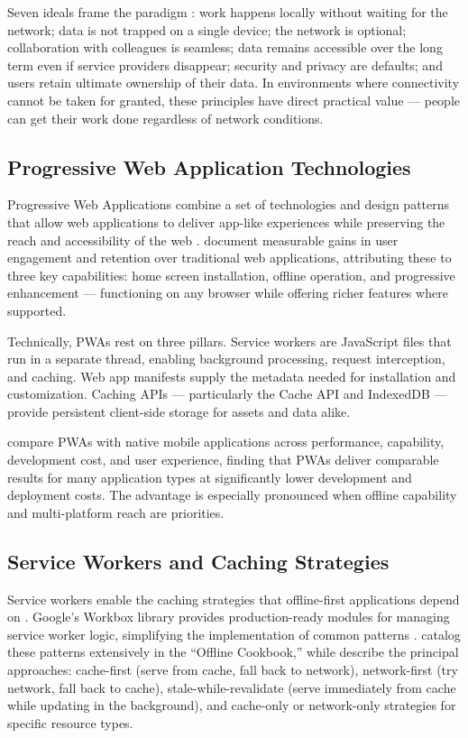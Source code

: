 Seven ideals frame the paradigm \citep{Kleppmann2019}: work happens locally without waiting for the network; data is not trapped on a single device; the network is optional; collaboration with colleagues is seamless; data remains accessible over the long term even if service providers disappear; security and privacy are defaults; and users retain ultimate ownership of their data. In environments where connectivity cannot be taken for granted, these principles have direct practical value --- people can get their work done regardless of network conditions.

\subsection{Progressive Web Application Technologies}

Progressive Web Applications combine a set of technologies and design patterns that allow web applications to deliver app-like experiences while preserving the reach and accessibility of the web \citep{AterPWA2017, Majchrzak2018}. \citet{Tandel2018} document measurable gains in user engagement and retention over traditional web applications, attributing these to three key capabilities: home screen installation, offline operation, and progressive enhancement --- functioning on any browser while offering richer features where supported.

Technically, PWAs rest on three pillars. Service workers are JavaScript files that run in a separate thread, enabling background processing, request interception, and caching. Web app manifests supply the metadata needed for installation and customization. Caching APIs --- particularly the Cache API and IndexedDB --- provide persistent client-side storage for assets and data alike.

\citet{BiornHansen2017} compare PWAs with native mobile applications across performance, capability, development cost, and user experience, finding that PWAs deliver comparable results for many application types at significantly lower development and deployment costs. The advantage is especially pronounced when offline capability and multi-platform reach are priorities.

\subsection{Service Workers and Caching Strategies}

Service workers enable the caching strategies that offline-first applications depend on \citep{Gaunt2020}. Google's Workbox library provides production-ready modules for managing service worker logic, simplifying the implementation of common patterns \citep{Workbox2024}. \citet{ArchibaldJake2023} catalog these patterns extensively in the ``Offline Cookbook,'' while \citet{AhnAllen2020} describe the principal approaches: cache-first (serve from cache, fall back to network), network-first (try network, fall back to cache), stale-while-revalidate (serve immediately from cache while updating in the background), and cache-only or network-only strategies for specific resource types.

